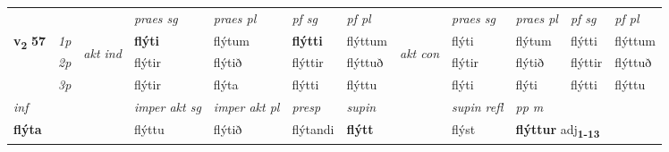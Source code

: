 \begin{longtable}[l]{X>{\footnotesize\itshape}llXXXXlXXXX}
 & &   & \textit{praes sg}  & \textit{praes pl}    & \textit{ pf sg} & \textit{pf pl} & & \textit{praes sg}  & \textit{praes pl}    & \textit{pf sg} & \textit{pf pl }  \\ \cmidrule{4-7} \cmidrule{9-12}
 \multirow{2}{*}{{{\textbf{v{\textsubscript{2}}} \Large{\textbf{57}}}}}  & 1p & \multirow{3}{*}{\begin{turn}{90}\textit{akt ind}\end{turn}} & \textbf{flýti} & flýtum & \textbf{flýtti} & flýttum & \multirow{3}{*}{\begin{turn}{90}\textit{akt con}\end{turn}} &flýti & flýtum & flýtti & flýttum\\*
 & 2p &  &  flýtir  & flýtið & flýttir & flýttuð & & flýtir & flýtið & flýttir & flýttuð \\*
 & 3p &  & flýtir & flýta & flýtti & flýttu & & flýti & flýti& flýtti & flýttu \\*
\cmidrule{4-7} \cmidrule{9-12}

   {\textit{inf}} & &  & \textit{imper akt sg} & \textit{imper akt pl}   & \textit{presp} & \textit{supin} && \textit{supin refl} & \textit{pp m} \\*
  {\textbf{flýta}} & && flýttu  & flýtið   & flýtandi &  \textbf{flýtt} && flýst & \multicolumn{2}{l}{\textbf{flýttur} adj\textbf{\textsubscript{1-13}}} \\*


\end{longtable}
